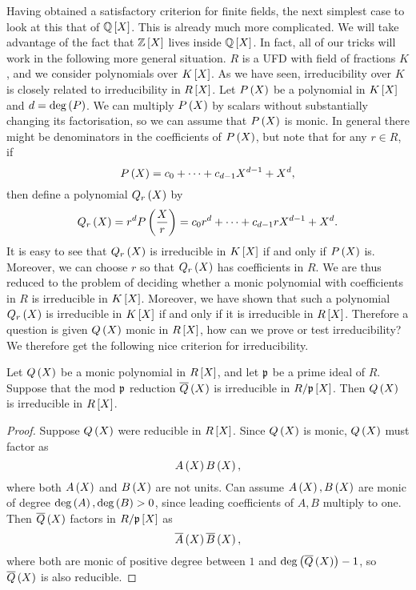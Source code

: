 Having obtained a satisfactory criterion for finite fields, the next simplest case to look at this that of $ \Q\sb{X} $. This is already much more complicated. We will take advantage of the fact that $ \Z\sb{X} $ lives inside $ \Q\sb{X} $. In fact, all of our tricks will work in the following more general situation. $ R $ is a UFD with field of fractions $ K $, and we consider polynomials over $ K\sb{X} $. As we have seen, irreducibility over $ K $ is closely related to irreducibility in $ R\sb{X} $. Let $ P\rb{X} $ be a polynomial in $ K\sb{X} $ and $ d = \deg\rb{P} $. We can multiply $ P\rb{X} $ by scalars without substantially changing its factorisation, so we can assume that $ P\rb{X} $ is monic. In general there might be denominators in the coefficients of $ P\rb{X} $, but note that for any $ r \in R $, if
$$ P\rb{X} = c_0 + \dots + c_{d - 1}X^{d - 1} + X^d, $$
then define a polynomial $ Q_r\rb{X} $ by
$$ Q_r\rb{X} = r^dP\rb{\dfrac{X}{r}} = c_0r^d + \dots + c_{d - 1}rX^{d - 1} + X^d. $$
It is easy to see that $ Q_r\rb{X} $ is irreducible in $ K\sb{X} $ if and only if $ P\rb{X} $ is. Moreover, we can choose $ r $ so that $ Q_r\rb{X} $ has coefficients in $ R $. We are thus reduced to the problem of deciding whether a monic polynomial with coefficients in $ R $ is irreducible in $ K\sb{X} $. Moreover, we have shown that such a polynomial $ Q_r\rb{X} $ is irreducible in $ K\sb{X} $ if and only if it is irreducible in $ R\sb{X} $. Therefore a question is given $ Q\rb{X} $ monic in $ R\sb{X} $, how can we prove or test irreducibility? We therefore get the following nice criterion for irreducibility.

\pagebreak

\begin{proposition}
Let $ Q\rb{X} $ be a monic polynomial in $ R\sb{X} $, and let $ \pp $ be a prime ideal of $ R $. Suppose that the mod $ \pp $ reduction $ \overline{Q}\rb{X} $ is irreducible in $ R / \pp\sb{X} $. Then $ Q\rb{X} $ is irreducible in $ R\sb{X} $.
\end{proposition}

\begin{proof}
Suppose $ Q\rb{X} $ were reducible in $ R\sb{X} $. Since $ Q\rb{X} $ is monic, $ Q\rb{X} $ must factor as
$$ A\rb{X}B\rb{X}, $$
where both $ A\rb{X} $ and $ B\rb{X} $ are not units. Can assume $ A\rb{X}, B\rb{X} $ are monic of degree $ \deg\rb{A}, \deg\rb{B} > 0 $, since leading coefficients of $ A, B $ multiply to one. Then $ \overline{Q}\rb{X} $ factors in $ R / \pp\sb{X} $ as
$$ \overline{A}\rb{X}\overline{B}\rb{X}, $$
where both are monic of positive degree between $ 1 $ and $ \deg\rb{\overline{Q}\rb{X}} - 1 $, so $ \overline{Q}\rb{X} $ is also reducible.
\end{proof}

